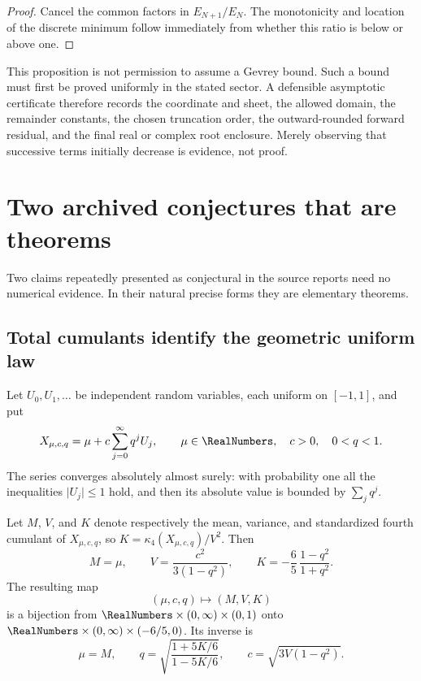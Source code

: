 \begin{proof}
Cancel the common factors in \(E_{N+1}/E_N\).  The monotonicity and location of
the discrete minimum follow immediately from whether this ratio is below or
above one.
\end{proof}

This proposition is not permission to assume a Gevrey bound.  Such a bound
must first be proved uniformly in the stated sector.  A defensible asymptotic
certificate therefore records the coordinate and sheet, the allowed domain,
the remainder constants, the chosen truncation order, the outward-rounded
forward residual, and the final real or complex root enclosure.  Merely
observing that successive terms initially decrease is evidence, not proof.

\section{Two archived conjectures that are theorems}
\label{sec:upgraded-conjectures}

Two claims repeatedly presented as conjectural in the source reports need no
numerical evidence.  In their natural precise forms they are elementary
theorems.

\subsection{Total cumulants identify the geometric uniform law}

Let \(U_0,U_1,\ldots\) be independent random variables, each uniform on
\([-1,1]\), and put
\[
 X_{\mu,c,q}=\mu+c\sum_{j=0}^{\infty}q^jU_j,
 \qquad
 \mu\in\RealNumbers,\quad c>0,\quad 0<q<1.
\]
The series converges absolutely almost surely: with probability one all the
inequalities \(\lvert U_j\rvert\le1\) hold, and then its absolute value is
bounded by \(\sum_jq^j\).

\begin{theorem}
\label{thm:total-cumulant-identifiability}
Let \(M\), \(V\), and \(K\) denote respectively the mean, variance, and
standardized fourth cumulant of \(X_{\mu,c,q}\), so
\(K=\kappa_4(X_{\mu,c,q})/V^2\).  Then
\[
 M=\mu,\qquad
 V=\frac{c^2}{3(1-q^2)},\qquad
 K=-\frac65\,\frac{1-q^2}{1+q^2}.
\]
The resulting map
\[
 (\mu,c,q)\longmapsto(M,V,K)
\]
is a bijection from
\(\RealNumbers\times(0,\infty)\times(0,1)\) onto
\(\RealNumbers\times(0,\infty)\times(-6/5,0)\).  Its inverse is
\[
 \mu=M,\qquad
 q=\sqrt{\frac{1+5K/6}{1-5K/6}},\qquad
 c=\sqrt{3V(1-q^2)}.
\]
\end{theorem}


